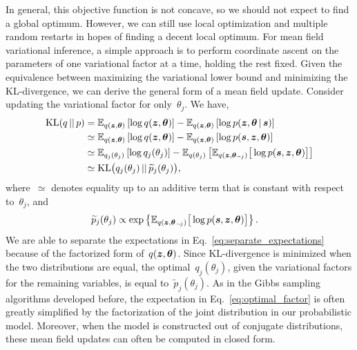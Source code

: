 In general, this objective function is not concave, so we should not expect 
to find a global optimum. However, we can still use local optimization 
and multiple random restarts in hopes of finding a decent local optimum. 
For mean field variational inference, a simple approach is to perform coordinate 
ascent on the parameters of one variational factor at a time, holding the rest
fixed. Given the equivalence between maximizing the variational lower bound and 
minimizing the KL-divergence, we can derive the general form of a mean field 
update. Consider updating the variational factor for only~$\theta_j$. We have,
\begin{align}
  \mathrm{KL}(q {\,||\,} p) 
  &= \mathbb{E}_{q(\boldsymbol{z}, \boldsymbol{\theta})} \left[ \log q(\boldsymbol{z}, \boldsymbol{\theta}) \right] 
   - \mathbb{E}_{q(\boldsymbol{z}, \boldsymbol{\theta})} \left[ \log p(\boldsymbol{z}, \boldsymbol{\theta} \,|\, \boldsymbol{s}) \right] \\
  &\simeq \mathbb{E}_{q(\boldsymbol{z}, \boldsymbol{\theta})} \left[ \log q(\boldsymbol{z}, \boldsymbol{\theta}) \right] 
   - \mathbb{E}_{q(\boldsymbol{z}, \boldsymbol{\theta})} \left[ \log p(\boldsymbol{s}, \boldsymbol{z}, \boldsymbol{\theta}) \right]  \\
  \label{eq:separate_expectations}
  &\simeq \mathbb{E}_{q_j(\theta_j)} \left[ \log q_j(\theta_j) \right] 
   - \mathbb{E}_{q(\theta_j)} \left[ \mathbb{E}_{q(\boldsymbol{z}, \boldsymbol{\theta}_{\neg j})} \big[ \log p(\boldsymbol{s}, \boldsymbol{z}, \boldsymbol{\theta}) \big] \right] \\
  &\simeq \mathrm{KL} \big( q_j(\theta_j) {\,||\,} \widetilde{p}_j(\theta_j) \big),
\end{align}
where~$\simeq$ denotes equality up to an additive term that is
constant with respect to~$\theta_j$, and
\begin{align}
  \label{eq:optimal_factor}
  \widetilde{p}_j(\theta_j) 
  &\propto \exp \left \{ \mathbb{E}_{q(\boldsymbol{z}, \boldsymbol{\theta}_{\neg j})} \big[ \log p(\boldsymbol{s}, \boldsymbol{z}, \boldsymbol{\theta}) \big] \right \}.
\end{align}
We are able to separate the expectations in
Eq.~\ref{eq:separate_expectations} because of the factorized form
of~$q(\boldsymbol{z}, \boldsymbol{\theta})$.
Since KL-divergence is minimized when the two
distributions are equal, the optimal~$q_j(\theta_j)$, given the
variational factors for the remaining variables, is equal
to~$\widetilde{p}_j(\theta_j)$.  As in the Gibbs sampling algorithms
developed before, the expectation in Eq.~\ref{eq:optimal_factor} is
often greatly simplified by the factorization of the joint
distribution in our probabilistic model. Moreover, when the model 
is constructed out of conjugate distributions, these mean field 
updates can often be computed in closed form.

